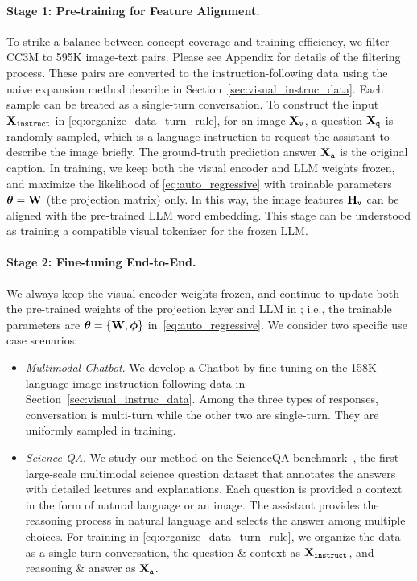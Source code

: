 \paragraph{Stage 1: Pre-training for Feature Alignment.} To strike a balance between concept coverage and training efficiency, we filter CC3M to 595K image-text pairs. Please see Appendix for details of the filtering process. These pairs are converted to the instruction-following data using the naive expansion method describe in Section~\ref{sec:visual_instruc_data}.
Each sample can be treated as a single-turn conversation. To construct the input ${{\bf X}}_{\texttt{instruct}}$ in \eqref{eq:organize_data_turn_rule}, for an image ${{\bf X}}_{\texttt{v}}$, a question ${{\bf X}}_{\texttt{q}}$ is randomly sampled, which is a language instruction to request the assistant to describe the image briefly. The ground-truth prediction answer ${{\bf X}}_{\texttt{a}}$ is the original caption. In training, we keep both the visual encoder and LLM weights frozen, and maximize the likelihood of \eqref{eq:auto_regressive} with trainable parameters $\boldsymbol{\theta} = {{\bf W}}$ (the projection matrix) only. In this way, the image features ${\bf H}_{\texttt{v}} $ can be aligned with the pre-trained LLM word embedding. This stage can be understood as training a compatible visual tokenizer for the frozen LLM.
  
\paragraph{Stage 2: Fine-tuning End-to-End.} 
We always keep the visual encoder weights frozen, and continue to update both the pre-trained weights of the projection layer and LLM in \shortname{}; i.e., the trainable parameters are $\boldsymbol{\theta} = \{{{\bf W}}, \boldsymbol{\phi} \}$ in~\eqref{eq:auto_regressive}. We consider two specific use case scenarios:




\begin{itemize}[leftmargin=7.5mm]
\setlength{\itemsep}{2pt}
\item 
{\it Multimodal Chatbot}. We develop a Chatbot by fine-tuning on the 158K language-image instruction-following data in Section~\ref{sec:visual_instruc_data}. Among the three types of responses, conversation is multi-turn while the other two are single-turn. They are uniformly sampled in training.
\item
{\it Science QA}. We study our method on the ScienceQA benchmark~\cite{lu2022learn}, the first large-scale multimodal science question dataset that annotates the answers with detailed lectures and explanations. Each question is provided a context in the form of natural language or an image. The assistant provides the reasoning process in natural language and selects the answer among multiple choices. 
For training in \eqref{eq:organize_data_turn_rule}, we organize the data as a single turn conversation, the question \& context as ${{\bf X}}_{\texttt{instruct}}$, and reasoning \& answer as ${{\bf X}}_{\texttt{a}}$.
\end{itemize}
